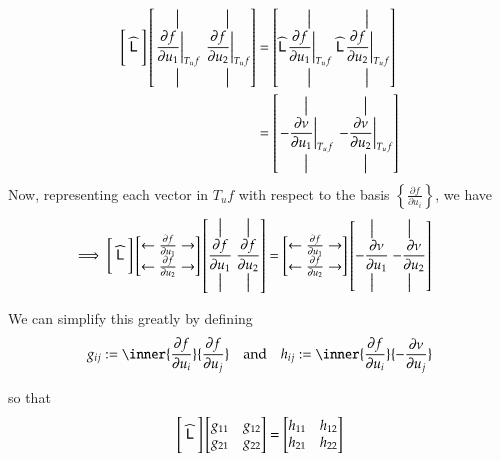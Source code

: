 	\begin{align}
	\Bigg[ \;\widehat{\mathsf{L}}\; \Bigg]
	\left[ \overset{\big\vert}{\underset{\big\vert}{\left.\frac{\partial f}{\partial u_1}\right|_{T_u f}}} \;
			\overset{\big\vert}{\underset{\big\vert}{\left.\frac{\partial f}{\partial u_2}\right|_{T_u f}}} \right]
			&= \left[ \widehat{\mathsf{L}} \overset{\big\vert}{\underset{\big\vert}{\left.\frac{\partial f}{\partial u_1}\right|_{T_u f}}} \;
			\widehat{\mathsf{L}} \overset{\big\vert}{\underset{\big\vert}{\left.\frac{\partial f}{\partial u_2}\right|_{T_u f}}} \right] \\
			&= \left[ \overset{\big\vert}{\underset{\big\vert}{ \left.-\frac{\partial \nu}{\partial u_1}\right|_{T_u f}}} \;
			\overset{\big\vert}{\underset{\big\vert}{\left.-\frac{\partial \nu}{\partial u_2}\right|_{T_u f}}} \right]
			\end{align}
			Now, representing each vector in  $T_u f$ with respect to the basis $\left\{ \frac{\partial f}{\partial u_i}\right\}$, we have
			\begin{align}
			\implies
			\Bigg[ \;\widehat{\mathsf{L}}\; \Bigg]
			\begin{bmatrix} \leftarrow \frac{\partial f}{\partial u_1} \rightarrow \\
							\leftarrow \frac{\partial f}{\partial u_2} \rightarrow
							\end{bmatrix}
			\left[ \overset{\big\vert}{\underset{\big\vert}{\frac{\partial f}{\partial u_1}}} \;
				\overset{\big\vert}{\underset{\big\vert}{\frac{\partial f}{\partial u_2}}}\right]
				&= \begin{bmatrix} \leftarrow \frac{\partial f}{\partial u_1} \rightarrow \\
				\leftarrow \frac{\partial f}{\partial u_2} \rightarrow
				\end{bmatrix}
				\left[ \overset{\big\vert}{\underset{\big\vert}{-\frac{\partial \nu}{\partial u_1}}} \;
				\overset{\big\vert}{\underset{\big\vert}{-\frac{\partial \nu}{\partial u_2}}}\right]
	\end{align}
		 
	We can simplify this greatly by defining 
	\begin{equation}\label{fundamentalformcoefficients}
	g_{ij} := \inner{\frac{\partial f}{\partial u_i}}{\frac{\partial f}{\partial u_j}}
	\quad \textrm{and}\quad
	h_{ij} := \inner{\frac{\partial f}{\partial u_i}}{-\frac{\partial \nu}{\partial u_j}}
	\end{equation}
	
	so that
	\begin{equation}
	\Bigg[ \;\widehat{\mathsf{L}}\; \Bigg]
	\begin{bmatrix} g_{11} & g_{12} \\ g_{21} & g_{22} \end{bmatrix}
	= \begin{bmatrix} h_{11} & h_{12} \\ h_{21} & h_{22} \end{bmatrix}
	\end{equation}
	
